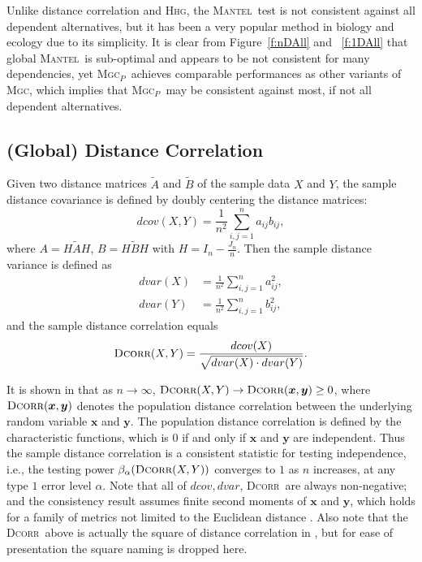\documentclass[11pt]{article}
\providecommand{\sct}[1]{{\normalfont\textsc{#1}}}
\providecommand{\mb}[1]{\boldsymbol{#1}}
\newcommand{\Mgc}{\sct{Mgc}}
\newcommand{\Mgcp}{\sct{Mgc$_P$}}
\newcommand{\Hhg}{\sct{Hhg}}
\newcommand{\Dcorr}{\sct{Dcorr}}
\newcommand{\Mantel}{\sct{Mantel}}
\begin{document}
Unlike distance correlation and \Hhg, the \Mantel~test is not consistent against all dependent alternatives, but it has been a very popular method in biology and ecology due to its simplicity. It is clear from Figure~\ref{f:nDAll} and ~\ref{f:1DAll} that global \Mantel~is sub-optimal and appears to be not consistent for many dependencies, yet \Mgcp~achieves comparable performances as other variants of \Mgc, which implies that \Mgcp~may be consistent against most, if not all dependent alternatives.

\subsection{(Global) Distance Correlation}
\label{appen:dcorr}
Given two distance matrices $\tilde{A}$ and $\tilde{B}$ of the sample data $X$ and $Y$, the sample distance covariance is defined by doubly centering the distance matrices:
\begin{equation*}
\label{dcovEqu}
dcov(X,Y)=\frac{1}{n^2}\sum_{i,j=1}^{n}a_{ij}b_{ij},
\end{equation*}
where $A=H\tilde{A}H$, $B=H\tilde{B}H$ with $H=I_{n}-\frac{J_{n}}{n}$. Then the sample distance variance is defined as
\begin{align*}
dvar(X) &=\frac{1}{n^2}\sum_{i,j=1}^{n}a_{ij}^{2},\\
dvar(Y) &=\frac{1}{n^2}\sum_{i,j=1}^{n}b_{ij}^{2},
\end{align*}
and the sample distance correlation equals
\begin{equation*}
\Dcorr(X,Y)=\frac{dcov(X)}{\sqrt{dvar(X) \cdot dvar(Y)}}.
\end{equation*}

It is shown in \cite{SzekelyRizzoBakirov2007} that as $n \rightarrow \infty$, $\Dcorr(X,Y) \rightarrow \Dcorr(\mb{x},\mb{y}) \geq 0$, where $\Dcorr(\mb{x},\mb{y})$ denotes the population distance correlation between the underlying random variable $\mb{x}$ and $\mb{y}$. The population distance correlation is defined by the characteristic functions, which is $0$ if and only if $\mb{x}$ and $\mb{y}$ are independent. Thus the sample distance correlation is a consistent statistic for testing independence, i.e., the testing power $\beta_{\alpha}(\Dcorr(X,Y))$
converges to $1$ as $n$ increases, at any type $1$ error level $\alpha$. Note that all of $dcov, dvar$, \Dcorr~are always non-negative; and the consistency result assumes finite second moments of $\mb{x}$ and $\mb{y}$, which holds for a family of metrics not limited to the Euclidean distance \cite{Lyons2013}. Also note that the \Dcorr~above is actually the square of distance correlation in \cite{SzekelyRizzoBakirov2007}, but for ease of presentation the square naming is dropped here.
\end{document}

